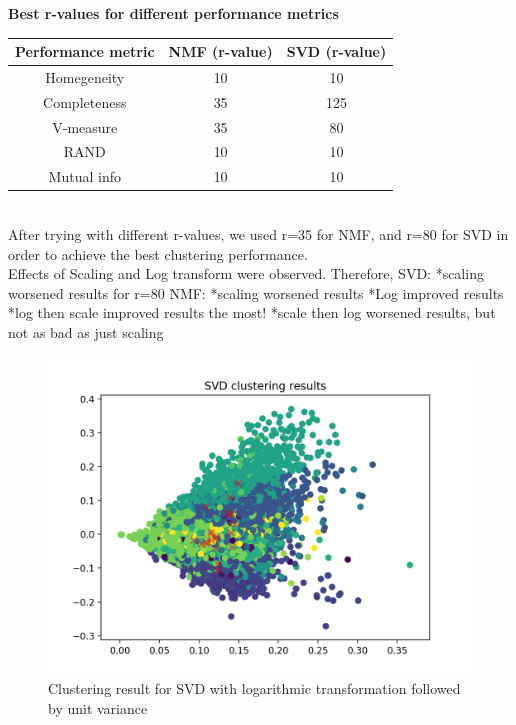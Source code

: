 \documentclass{report}
\begin{document}
\begin{center}
	\textbf{Best r-values for different performance metrics} \\ \vspace{10pt}
	\begin{tabular}{*{3}{c}}
		\toprule
		\textbf{Performance metric} & \textbf{NMF (r-value)} & \textbf{SVD (r-value)} \\
		\midrule
		Homegeneity & 10 & 10 \\
		\midrule		
		Completeness & 35 & 125 \\
		\midrule		
		V-measure & 35 & 80 \\
		\midrule		
		RAND & 10 & 10   \\
		\midrule
		Mutual info & 10 & 10  \\
		\bottomrule
	\end{tabular}
\end{center}
\\

After trying with different r-values, we used r=35 for NMF, and r=80 for SVD in order to achieve the best clustering performance. \\ 
Effects of Scaling and Log transform were observed. Therefore,
	SVD:	*scaling worsened results for r=80
	NMF:	*scaling worsened results
			*Log improved results
			*log then scale improved results the most!
			*scale then log worsened results, but not as bad as just scaling	
\\ \vspace{10pt}

\begin{figure}
  \includegraphics[width=\linewidth]{p5_svd_clustering.png} 
  \vspace*{-20mm}
  \caption{Clustering result for SVD with logarithmic transformation followed by unit variance}
  \label{fig:svd3}
\end{figure}
\end{document}
